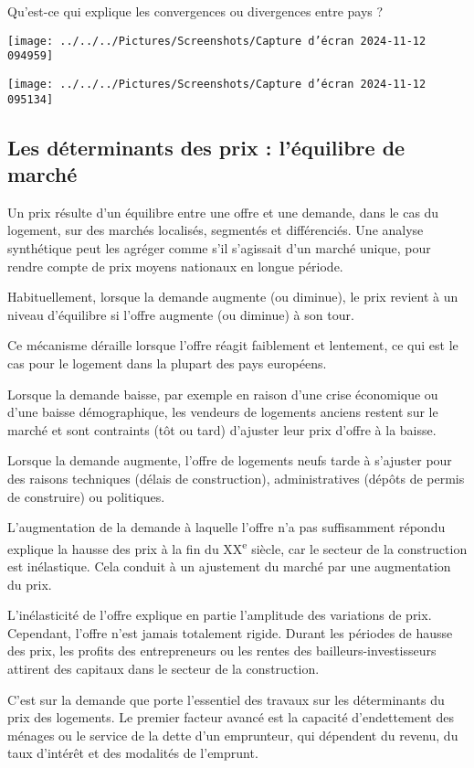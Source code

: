 \documentclass[a4paper, 12pt]{report}
\begin{document}
Qu’est-ce qui explique les convergences ou divergences entre pays ?

\begin{center}
\texttt{[image: ../../../Pictures/Screenshots/Capture d'écran 2024-11-12 094959]}

\texttt{[image: ../../../Pictures/Screenshots/Capture d'écran 2024-11-12 095134]}
\end{center}
\subsection{Les déterminants des prix : l'équilibre de marché}

Un prix résulte d’un équilibre entre une offre et une demande, dans le cas du logement, sur des marchés localisés, segmentés et différenciés. Une analyse synthétique peut les agréger comme s’il s’agissait d’un marché unique, pour rendre compte de prix moyens nationaux en longue période.

Habituellement, lorsque la demande augmente (ou diminue), le prix revient à un niveau d’équilibre si l’offre augmente (ou diminue) à son tour.

Ce mécanisme déraille lorsque l’offre réagit faiblement et lentement, ce qui est le cas pour le logement dans la plupart des pays européens.

Lorsque la demande baisse, par exemple en raison d’une crise économique ou d’une baisse démographique, les vendeurs de logements anciens restent sur le marché et sont contraints (tôt ou tard) d’ajuster leur prix d’offre à la baisse.

Lorsque la demande augmente, l’offre de logements neufs tarde à s’ajuster pour des raisons techniques (délais de construction), administratives (dépôts de permis de construire) ou politiques.

L’augmentation de la demande à laquelle l’offre n’a pas suffisamment répondu explique la hausse des prix à la fin du XX\textsuperscript{e} siècle, car le secteur de la construction est inélastique. Cela conduit à un ajustement du marché par une augmentation du prix.

L’inélasticité de l’offre explique en partie l’amplitude des variations de prix. Cependant, l’offre n’est jamais totalement rigide. Durant les périodes de hausse des prix, les profits des entrepreneurs ou les rentes des bailleurs-investisseurs attirent des capitaux dans le secteur de la construction.

C’est sur la demande que porte l’essentiel des travaux sur les déterminants du prix des logements. Le premier facteur avancé est la capacité d’endettement des ménages ou le service de la dette d’un emprunteur, qui dépendent du revenu, du taux d’intérêt et des modalités de l’emprunt.
\end{document}
